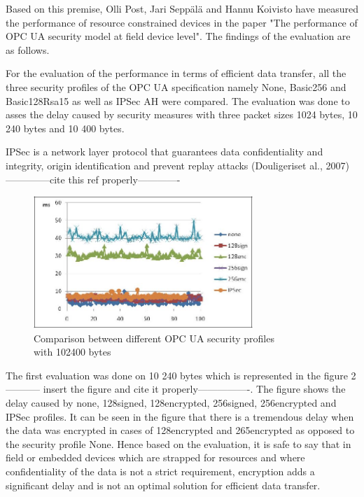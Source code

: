 \documentclass[conference]{IEEEtran}
\begin{document}
Based on this premise, Olli Post, Jari Sepp\"al\"a and Hannu Koivisto have measured the performance of resource constrained devices in the paper "The performance of OPC UA security model at field device level". The findings of the evaluation are as follows. \cite{post2009performance}

For the evaluation of the performance in terms of efficient data transfer, all the three security profiles of the OPC UA specification namely None, Basic256 and Basic128Rsa15 as well as IPSec AH were compared. The evaluation was done to asses the delay caused by security measures with three packet sizes 1024 bytes, 10 240 bytes and 10 400 bytes.

IPSec is a network layer protocol that guarantees data confidentiality and integrity, origin identification and prevent replay attacks (Douligeriset al., 2007)--------------cite this ref properly-------------

\begin{figure}[ht]
\centering
\includegraphics[height=50mm]{Figures/security_fig2}\quad
\caption[Subfigure example]{\label{f:security_fig2}Comparison between different OPC UA security profiles\\ with 102400 bytes}
\end{figure}

The first evaluation was done on 10 240 bytes which is represented in the figure 2 ----------- insert the figure and cite it properly----------------. The figure shows the delay caused by none, 128signed, 128encrypted, 256signed, 256encrypted and IPSec profiles. It can be seen in the figure that there is a tremendous delay when the data was encrypted in cases of 128encrypted and 265encrypted as opposed to the security profile None. Hence based on the evaluation, it is safe to say that in field or embedded devices which are strapped for resources and where confidentiality of the data is not a strict requirement, encryption adds a significant delay and is not an optimal solution for efficient data transfer. 
\end{document}
